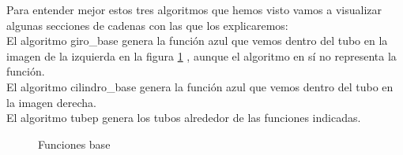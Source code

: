  Para entender mejor estos tres algoritmos que hemos visto vamos a visualizar algunas secciones de cadenas con las que los explicaremos:\\
 
 El algoritmo giro\_base genera la función azul que vemos dentro del tubo en la imagen de la izquierda en la figura \ref{final1} , aunque el algoritmo en sí no representa la función.  \\
 
 El algoritmo cilindro\_base genera la función azul que vemos dentro del tubo en la imagen derecha.\\

 El algoritmo  tubep genera los tubos alrededor de las funciones indicadas. 
 
 \begin{figure}[h!]
 	\centering
 	\space
 	\caption{Funciones base}
 	\label{final1} 
 \end{figure}
 
